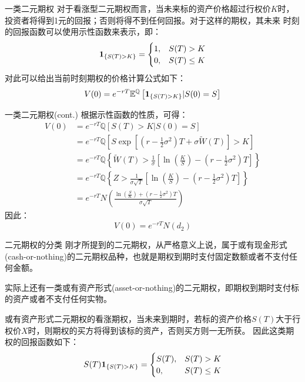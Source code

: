 \documentclass[t]{beamer}
\newcommand{\EQ}{\mathbb{E}^{\mathbb{Q}}}
\begin{document}
\begin{frame}{一类二元期权}
对于看涨型二元期权而言，当未来标的资产价格超过行权价$K$时，投资者将得到1元的回报；否则将得不到任何回报。对于这样的期权，其未来 时刻的回报函数可以使用示性函数来表示，即：
\[{\bf 1}_{\{S(T)>K\}}=\begin{cases}
1,& S(T)>K\\
0,& S(T)\le K
\end{cases} \]
对此可以给出当前时刻期权的价格计算公式如下：
\[V(0)=e^{-rT}\EQ\left[{\bf 1}_{\{S(T)>K\}}|S(0)=S\right] \]
\end{frame}

\begin{frame}{一类二元期权(cont.)}
根据示性函数的性质，可得：
\begin{equation*}
\begin{split}
V(0)&=e^{-rT}\mathbb{Q}[S(T)>K|S(0)=S]\\
&=e^{-rT}\mathbb{Q}\left[S\exp\left[\left(r-\frac{1}{2}\sigma^2 \right) T+\sigma \widetilde{W}(T)\right]>K \right]\\
&=e^{-rT}\mathbb{Q}\left\{\widetilde{W}(T)>\frac{1}{\sigma}\left[\ln\left( \frac{K}{S}\right) -\left(r-\frac{1}{2}\sigma^2 \right) T\right] \right\}\\
&=e^{-rT}\mathbb{Q}\left\{Z>\frac{1}{\sigma\sqrt{T}}\left[\ln\left( \frac{K}{S}\right) -\left(r-\frac{1}{2}\sigma^2 \right) T\right] \right\}\\
&=e^{-rT}N\left(\frac{\ln\left( \frac{S}{K}\right) +\left(r-\frac{1}{2}\sigma^2 \right) T}{\sigma\sqrt{T}} \right)
\end{split}
\end{equation*}
因此：\begin{equation*}
V(0)=e^{-rT}N(d_2)
\end{equation*}
\end{frame}

\begin{frame}{二元期权的分类}
刚才所提到的二元期权，从严格意义上说，属于{\color{blue}或有现金形式(cash-or-nothing)}的二元期权品种，也就是期权到期时支付固定数额或者不支付任何金额。

实际上还有一类{\color{red}或有资产形式(asset-or-nothing)}的二元期权，即期权到期时支付标的资产或者不支付任何实物。

或有资产形式二元期权的看涨期权，当未来到期时，若标的资产价格$S(T)$大于行权价$X$时，则期权的买方将得到该标的资产，否则买方则一无所获。
因此这类期权的回报函数如下：
\[S(T){\bf 1}_{\{S(T)>K\}}=\begin{cases}
S(T),& S(T)>K\\
0,& S(T)\le K
\end{cases} \]
\end{frame}
\end{document}
